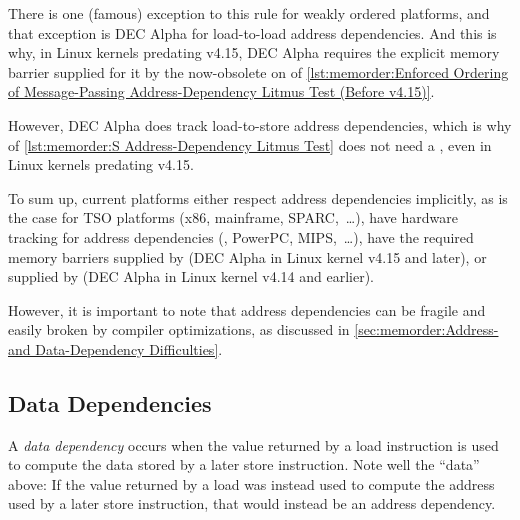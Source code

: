 {{	\begin{fcvref}
	There is one (famous) exception to this rule for weakly ordered
	platforms, and that exception is DEC Alpha for load-to-load
	address dependencies.
	And this is why, in Linux kernels predating v4.15, DEC Alpha
	requires the explicit memory barrier supplied for it by the
	now-obsolete  on  of
	\cref{lst:memorder:Enforced Ordering of Message-Passing Address-Dependency Litmus Test (Before v4.15)}.
	\end{fcvref}
	\begin{fcvref}
	However, DEC Alpha does track load-to-store address dependencies,
	which is why  of
	\cref{lst:memorder:S Address-Dependency Litmus Test}
	does not need a , even in Linux
	kernels predating v4.15.
	\end{fcvref}

	To sum up, current platforms either respect address dependencies
	implicitly, as is the case for TSO platforms (x86, mainframe,
	SPARC,~\dots), have hardware tracking for address dependencies
	(\ARM, PowerPC, MIPS,~\dots), have the required memory barriers
	supplied by  (DEC Alpha in Linux kernel v4.15 and
	later), or supplied by
	 (DEC Alpha in Linux kernel v4.14 and earlier).
}\QuickQuizEndB
%
\QuickQuizEndE
}

However, it is important to note that address dependencies can
be fragile and easily broken by compiler optimizations, as discussed in
\cref{sec:memorder:Address- and Data-Dependency Difficulties}.

\subsection{Data Dependencies}
\label{sec:memorder:Data Reordering}

A \emph{data dependency} occurs when the value returned by a load
instruction is used to compute the data stored by a later store
instruction.
Note well the ``data'' above: If the value returned by a load
was instead used to compute the address used by a later store
instruction, that would instead be an address dependency.

